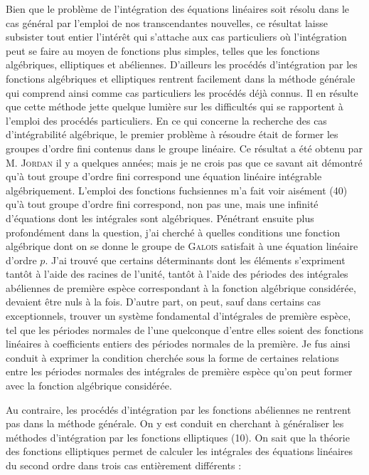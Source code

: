 \documentclass[11pt]{article}
\begin{document}
Bien que le problème de l’intégration des équations linéaires soit résolu dans le cas général par l’emploi de nos transcendantes nouvelles, ce résultat laisse subsister tout entier l’intérêt qui s’attache aux cas particuliers où l’intégration peut se faire au moyen de fonctions plus simples, telles que les fonctions algébriques, elliptiques et abéliennes. D’ailleurs les procédés d’intégration par les fonctions algébriques et elliptiques rentrent facilement dans la méthode générale qui comprend ainsi comme cas particuliers les procédés déjà connus. Il en résulte que cette méthode jette quelque lumière sur les difficultés qui se rapportent à l’emploi des procédés particuliers. En ce qui concerne la recherche des cas d’intégrabilité algébrique, le premier problème à résoudre était de former les groupes d’ordre fini contenus dans le groupe linéaire. Ce résultat a été obtenu par M. \textsc{Jordan} il y a quelques années; mais je ne crois pas que ce savant ait démontré qu’à tout groupe d’ordre fini correspond une équation linéaire intégrable algébriquement. L’emploi des fonctions fuchsiennes m’a fait voir aisément (40) qu’à tout groupe d’ordre fini correspond, non pas une, mais une infinité d’équations dont les intégrales sont algébriques. Pénétrant ensuite plus profondément dans la question, j’ai cherché à quelles conditions une fonction algébrique dont on se donne le groupe de \textsc{Galois} satisfait à une équation linéaire d’ordre $p$. J’ai trouvé que certains déterminants dont les éléments s’expriment tantôt à l’aide des racines de l’unité, tantôt à l’aide des périodes des intégrales abéliennes de première espèce correspondant à la fonction algébrique considérée, devaient être nuls à la fois. D’autre part, on peut, sauf dans certains cas exceptionnels, trouver un système fondamental d’intégrales de première espèce, tel que les périodes normales de l’une quelconque d’entre elles soient des fonctions linéaires à coefficients entiers des périodes normales de la première. Je fus ainsi conduit à exprimer la condition cherchée sous la forme de certaines relations entre les périodes normales des intégrales de première espèce qu’on peut former avec la fonction algébrique considérée.

Au contraire, les procédés d’intégration par les fonctions abéliennes ne rentrent pas dans la méthode générale. On y est conduit en cherchant à généraliser les méthodes d’intégration par les fonctions elliptiques (10). On sait que la théorie des fonctions elliptiques permet de calculer les intégrales des équations linéaires du second ordre dans trois cas entièrement différents :
\end{document}
